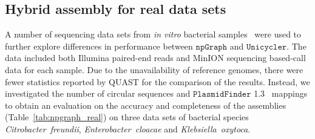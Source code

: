 \documentclass[10pt,letterpaper]{article}
\newcommand{\npgraph}{$\mathtt{npGraph}$}
\newcommand{\unicycler}{$\mathtt{Unicycler}$}
\newcommand{\minimap}{$\mathtt{minimap2}$}
\begin{document}
\subsection*{Hybrid assembly for real data sets}
A number of sequencing data sets from \emph{in vitro} bacterial samples~\cite{George2017M14} were used to further explore differences in performance between \npgraph{} and \unicycler{}.
The data included both Illumina paired-end reads and MinION sequencing based-call data for each sample.
Due to the unavailability of reference genomes, there were fewer statistics reported by QUAST for the comparison of the results. 
Instead, we investigated the number of circular sequences and $\mathtt{PlasmidFinder}$ 1.3~\cite{Carattoli2014} mappings to obtain an evaluation on the accuracy and completeness of the assemblies (Table~\ref{tab:npgraph_real}) 
on three data sets of bacterial species \emph{Citrobacter~freundii}, \emph{Enterobacter~cloacae} and \emph{Klebsiella~oxytoca}. 
\end{document}
